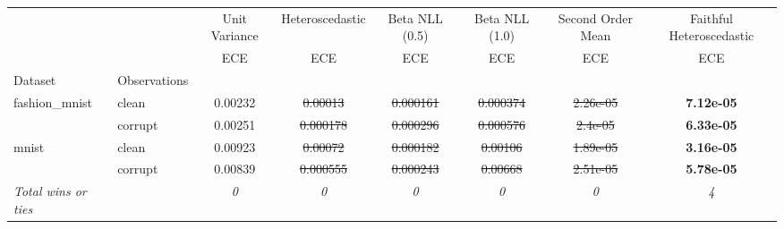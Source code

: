\begin{tabular}{ll|c|c|c|c|c|c}
\toprule
{} & {} & {Unit Variance} & {Heteroscedastic} & {Beta NLL (0.5)} & {Beta NLL (1.0)} & {Second Order Mean} & {Faithful Heteroscedastic} \\
{} & {} & {ECE} & {ECE} & {ECE} & {ECE} & {ECE} & {ECE} \\
{Dataset} & {Observations} & {} & {} & {} & {} & {} & {} \\
\midrule
\multirow[t]{2}{*}{fashion_mnist} & clean & 0.00232 & \sout{0.00013} & \sout{0.000161} & \sout{0.000374} & \sout{2.26e-05} & \textbf{7.12e-05} \\
 & corrupt & 0.00251 & \sout{0.000178} & \sout{0.000296} & \sout{0.000576} & \sout{2.4e-05} & \textbf{6.33e-05} \\
\multirow[t]{2}{*}{mnist} & clean & 0.00923 & \sout{0.00072} & \sout{0.000182} & \sout{0.00106} & \sout{1.89e-05} & \textbf{3.16e-05} \\
 & corrupt & 0.00839 & \sout{0.000555} & \sout{0.000243} & \sout{0.00668} & \sout{2.51e-05} & \textbf{5.78e-05} \\
\textit{{Total wins or ties}} &  & \textit{0} & \textit{0} & \textit{0} & \textit{0} & \textit{0} & \textit{4} \\
\bottomrule
\end{tabular}
